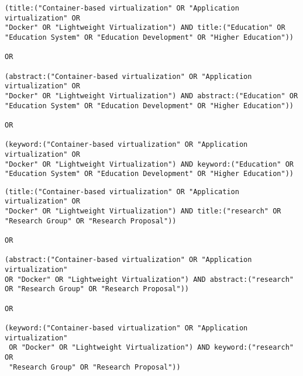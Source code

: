 \begin{tcolorbox}[
  colback=gray!5, 
  colframe=black!60, 
  title=Cadena de búsqueda en Springer para educación, 
  fonttitle=\bfseries, 
  sharp corners=south
]
\scriptsize %
\begin{verbatim}
(title:("Container-based virtualization" OR "Application virtualization" OR 
"Docker" OR "Lightweight Virtualization") AND title:("Education" OR 
"Education System" OR "Education Development" OR "Higher Education"))

OR

(abstract:("Container-based virtualization" OR "Application virtualization" OR 
"Docker" OR "Lightweight Virtualization") AND abstract:("Education" OR 
"Education System" OR "Education Development" OR "Higher Education"))

OR 

(keyword:("Container-based virtualization" OR "Application virtualization" OR 
"Docker" OR "Lightweight Virtualization") AND keyword:("Education" OR 
"Education System" OR "Education Development" OR "Higher Education"))

\end{verbatim}
\end{tcolorbox}

\begin{tcolorbox}[
  colback=gray!5, 
  colframe=black!60, 
  title=Cadena de búsqueda en Springer para investigación, 
  fonttitle=\bfseries, 
  sharp corners=south
]
\scriptsize %
\begin{verbatim}
(title:("Container-based virtualization" OR "Application virtualization" OR 
"Docker" OR "Lightweight Virtualization") AND title:("research" OR 
"Research Group" OR "Research Proposal"))

OR

(abstract:("Container-based virtualization" OR "Application virtualization" 
OR "Docker" OR "Lightweight Virtualization") AND abstract:("research" 
OR "Research Group" OR "Research Proposal"))

OR 

(keyword:("Container-based virtualization" OR "Application virtualization"
 OR "Docker" OR "Lightweight Virtualization") AND keyword:("research" OR 
 "Research Group" OR "Research Proposal"))

\end{verbatim}
\end{tcolorbox}

